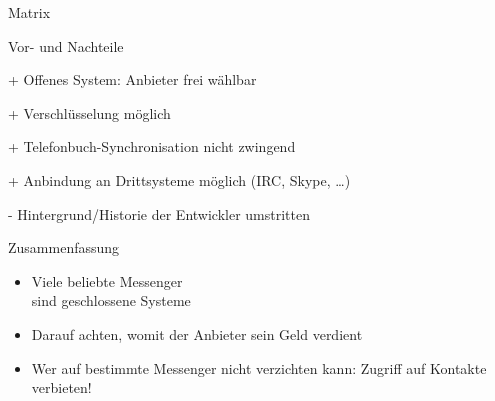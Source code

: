\begin{frame}{Matrix}
  \begin{blex}{Vor- und Nachteile}
    \item[+] Offenes System: Anbieter frei wählbar
    \item[+] Verschlüsselung möglich
    \item[+] Telefonbuch-Synchronisation nicht zwingend
    \item[+] Anbindung an Drittsysteme möglich (IRC, Skype, \ldots)
    \item[-] Hintergrund/Historie der Entwickler umstritten
  \end{blex}
\end{frame}

\begin{frame}{Zusammenfassung}
  \begin{itemize}
    \item Viele beliebte Messenger\\ sind geschlossene Systeme
    \item Darauf achten, womit der Anbieter sein Geld verdient
    \item Wer auf bestimmte Messenger nicht verzichten kann: Zugriff auf Kontakte verbieten!
  \end{itemize}
\end{frame}
